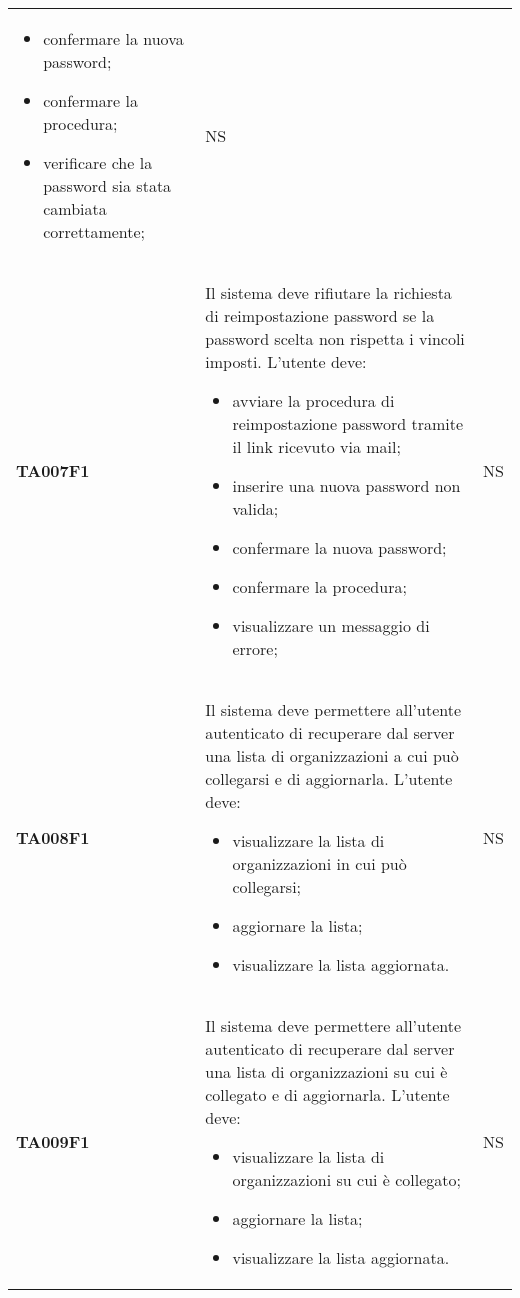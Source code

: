 \documentclass[../piano-di-qualifica.tex]{subfiles}
\begin{document}
\begin{centering}
\begin{longtable}[H]{>{\centering\bfseries}m{3cm} >{}p{10cm} >{\centering\arraybackslash}m{3cm}}
\begin{itemize}
                          \item confermare la nuova password;
                          \item confermare la procedura;
                          \item verificare che la password sia stata cambiata correttamente;
                        \end{itemize}
                      & NS \\
          TA007F1    & Il sistema deve rifiutare la richiesta di reimpostazione password se la password scelta non rispetta i vincoli imposti. \newline
                        L'utente deve:
                        \begin{itemize}
                          \item avviare la procedura di reimpostazione password tramite il link ricevuto via mail;
                          \item inserire una nuova password non valida;
                          \item confermare la nuova password;
                          \item confermare la procedura;
                          \item visualizzare un messaggio di errore;
                        \end{itemize}
                      & NS \\
        TA008F1      & Il sistema deve permettere all'utente autenticato di recuperare dal server una lista di organizzazioni a cui può collegarsi e di aggiornarla. \newline
                        L'utente deve:
                        \begin{itemize}
                          \item visualizzare la lista di organizzazioni in cui può collegarsi;
                          \item aggiornare la lista;
                          \item visualizzare la lista aggiornata.
                        \end{itemize}
                      & NS \\
        TA009F1      & Il sistema deve permettere all'utente autenticato di recuperare dal server una lista di organizzazioni su cui è collegato e di aggiornarla. \newline
                      L'utente deve:
                      \begin{itemize}
                        \item visualizzare la lista di organizzazioni su cui è collegato;
                        \item aggiornare la lista;
                        \item visualizzare la lista aggiornata.
                      \end{itemize}
                    & NS \\


\end{longtable}
\end{centering}
\end{document}
